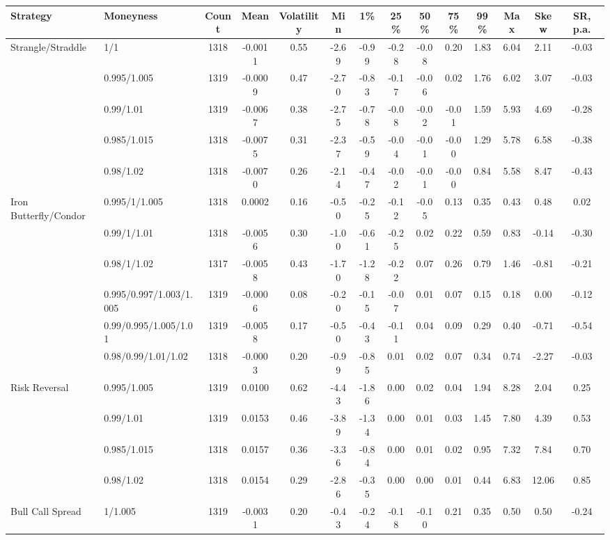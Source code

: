 \begin{tabular}{llcccccccccccc}
\toprule
Strategy & Moneyness & Count & Mean & Volatility & Min & 1\% & 25\% & 50\% & 75\% & 99\% & Max & Skew & SR, p.a. \\
\midrule
Strangle/Straddle & 1/1 & 1318 & -0.0011 & 0.55 & -2.69 & -0.99 & -0.28 & -0.08 & 0.20 & 1.83 & 6.04 & 2.11 & -0.03 \\
 & 0.995/1.005 & 1319 & -0.0009 & 0.47 & -2.70 & -0.83 & -0.17 & -0.06 & 0.02 & 1.76 & 6.02 & 3.07 & -0.03 \\
 & 0.99/1.01 & 1319 & -0.0067 & 0.38 & -2.75 & -0.78 & -0.08 & -0.02 & -0.01 & 1.59 & 5.93 & 4.69 & -0.28 \\
 & 0.985/1.015 & 1318 & -0.0075 & 0.31 & -2.37 & -0.59 & -0.04 & -0.01 & -0.00 & 1.29 & 5.78 & 6.58 & -0.38 \\
 & 0.98/1.02 & 1318 & -0.0070 & 0.26 & -2.14 & -0.47 & -0.02 & -0.01 & -0.00 & 0.84 & 5.58 & 8.47 & -0.43 \\
Iron Butterfly/Condor & 0.995/1/1.005 & 1318 & 0.0002 & 0.16 & -0.50 & -0.25 & -0.12 & -0.05 & 0.13 & 0.35 & 0.43 & 0.48 & 0.02 \\
 & 0.99/1/1.01 & 1318 & -0.0056 & 0.30 & -1.00 & -0.61 & -0.25 & 0.02 & 0.22 & 0.59 & 0.83 & -0.14 & -0.30 \\
 & 0.98/1/1.02 & 1317 & -0.0058 & 0.43 & -1.70 & -1.28 & -0.22 & 0.07 & 0.26 & 0.79 & 1.46 & -0.81 & -0.21 \\
 & 0.995/0.997/1.003/1.005 & 1319 & -0.0006 & 0.08 & -0.20 & -0.15 & -0.07 & 0.01 & 0.07 & 0.15 & 0.18 & 0.00 & -0.12 \\
 & 0.99/0.995/1.005/1.01 & 1319 & -0.0058 & 0.17 & -0.50 & -0.43 & -0.11 & 0.04 & 0.09 & 0.29 & 0.40 & -0.71 & -0.54 \\
 & 0.98/0.99/1.01/1.02 & 1318 & -0.0003 & 0.20 & -0.99 & -0.85 & 0.01 & 0.02 & 0.07 & 0.34 & 0.74 & -2.27 & -0.03 \\
Risk Reversal & 0.995/1.005 & 1319 & 0.0100 & 0.62 & -4.43 & -1.86 & 0.00 & 0.02 & 0.04 & 1.94 & 8.28 & 2.04 & 0.25 \\
 & 0.99/1.01 & 1319 & 0.0153 & 0.46 & -3.89 & -1.34 & 0.00 & 0.01 & 0.03 & 1.45 & 7.80 & 4.39 & 0.53 \\
 & 0.985/1.015 & 1318 & 0.0157 & 0.36 & -3.36 & -0.84 & 0.00 & 0.01 & 0.02 & 0.95 & 7.32 & 7.84 & 0.70 \\
 & 0.98/1.02 & 1318 & 0.0154 & 0.29 & -2.86 & -0.35 & 0.00 & 0.00 & 0.01 & 0.44 & 6.83 & 12.06 & 0.85 \\
Bull Call Spread & 1/1.005 & 1319 & -0.0031 & 0.20 & -0.43 & -0.24 & -0.18 & -0.10 & 0.21 & 0.35 & 0.50 & 0.50 & -0.24 \\

\end{tabular}
